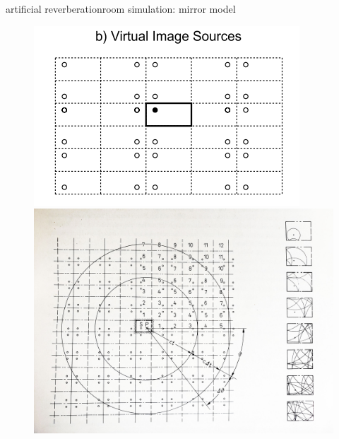 \begin{frame}{artificial reverberation}{room simulation: mirror model}
    \vspace{-3mm}
	\begin{figure}
		\centerline{\includegraphics[scale=.4]{graph/raummodell2}\includegraphics[scale=.05]{graph/mirrormodel}}
	\end{figure}
    
    \vspace{-3mm}
    
\end{frame}

